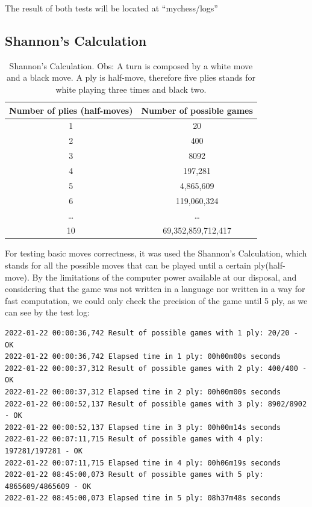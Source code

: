 \documentclass[10pt]{article}
\begin{document}
The result of both tests will be located at ``mychess/logs''


\subsection{Shannon's Calculation}


\begin{table}[H]
\center
\begin{tabular}{|c|c|}
\hline
\textbf{Number of plies (half-moves)}  & \textbf{Number of possible games}  \\
\hline
  1   & 20 \\
\hline
   2  &  400 \\
\hline
  3   & 8092 \\
\hline
4  & 197,281 \\
\hline
5   & 4,865,609 \\
\hline
6   & 119,060,324 \\
\hline
\ldots & \ldots \\
\hline
10 & 69,352,859,712,417 \\
\hline
\end{tabular}
\caption{Shannon's Calculation. Obs: A turn is composed by a white move and a
    black move. A ply is half-move, therefore five plies
stands for white playing three times and black two.}
\end{table}

For testing basic moves correctness, it was used the Shannon's Calculation,
which stands for all the possible moves that can be played until a certain
ply(half-move). By the limitations of the computer power available at our
disposal, and considering that the game was not written in a language nor
written in a way for fast computation, we could only check the precision of the
game until 5 ply, as we can see by the test log:
\begin{lstlisting}
2022-01-22 00:00:36,742 Result of possible games with 1 ply: 20/20 - OK
2022-01-22 00:00:36,742 Elapsed time in 1 ply: 00h00m00s seconds
2022-01-22 00:00:37,312 Result of possible games with 2 ply: 400/400 - OK
2022-01-22 00:00:37,312 Elapsed time in 2 ply: 00h00m00s seconds
2022-01-22 00:00:52,137 Result of possible games with 3 ply: 8902/8902 - OK
2022-01-22 00:00:52,137 Elapsed time in 3 ply: 00h00m14s seconds
2022-01-22 00:07:11,715 Result of possible games with 4 ply: 197281/197281 - OK
2022-01-22 00:07:11,715 Elapsed time in 4 ply: 00h06m19s seconds
2022-01-22 08:45:00,073 Result of possible games with 5 ply: 4865609/4865609 - OK
2022-01-22 08:45:00,073 Elapsed time in 5 ply: 08h37m48s seconds
    
\end{lstlisting}
\end{document}

